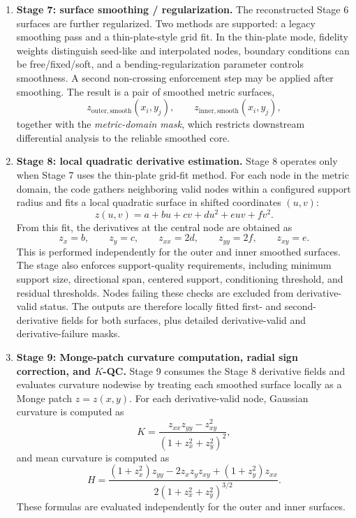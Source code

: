 \begin{enumerate}
  \item \textbf{Stage 7: surface smoothing / regularization.}  
  The reconstructed Stage 6 surfaces are further regularized. Two methods are supported: a legacy smoothing pass and a thin-plate-style grid fit. In the thin-plate mode, fidelity weights distinguish seed-like and interpolated nodes, boundary conditions can be free/fixed/soft, and a bending-regularization parameter controls smoothness. A second non-crossing enforcement step may be applied after smoothing. The result is a pair of smoothed metric surfaces,
  \[
    z_{\mathrm{outer,smooth}}(x_i,y_j), \qquad z_{\mathrm{inner,smooth}}(x_i,y_j),
  \]
  together with the \emph{metric-domain mask}, which restricts downstream differential analysis to the reliable smoothed core.

  \item \textbf{Stage 8: local quadratic derivative estimation.}  
  Stage 8 operates only when Stage 7 uses the thin-plate grid-fit method. For each node in the metric domain, the code gathers neighboring valid nodes within a configured support radius and fits a local quadratic surface in shifted coordinates \((u,v)\):
  \[
    z(u,v) = a + bu + cv + du^2 + euv + fv^2 .
  \]
  From this fit, the derivatives at the central node are obtained as
  \[
    z_x = b, \qquad z_y = c, \qquad z_{xx} = 2d, \qquad z_{yy} = 2f, \qquad z_{xy} = e .
  \]
  This is performed independently for the outer and inner smoothed surfaces. The stage also enforces support-quality requirements, including minimum support size, directional span, centered support, conditioning threshold, and residual thresholds. Nodes failing these checks are excluded from derivative-valid status. The outputs are therefore locally fitted first- and second-derivative fields for both surfaces, plus detailed derivative-valid and derivative-failure masks.

  \item \textbf{Stage 9: Monge-patch curvature computation, radial sign correction, and \(K\)-QC.}  
  Stage 9 consumes the Stage 8 derivative fields and evaluates curvature nodewise by treating each smoothed surface locally as a Monge patch \(z=z(x,y)\). For each derivative-valid node, Gaussian curvature is computed as
  \[
    K = \frac{z_{xx}z_{yy} - z_{xy}^2}{\left(1+z_x^2+z_y^2\right)^2},
  \]
  and mean curvature is computed as
  \[
    H = \frac{(1+z_x^2)z_{yy} - 2 z_x z_y z_{xy} + (1+z_y^2)z_{xx}}
             {2\left(1+z_x^2+z_y^2\right)^{3/2}} .
  \]
  These formulas are evaluated independently for the outer and inner surfaces.


\end{enumerate}
